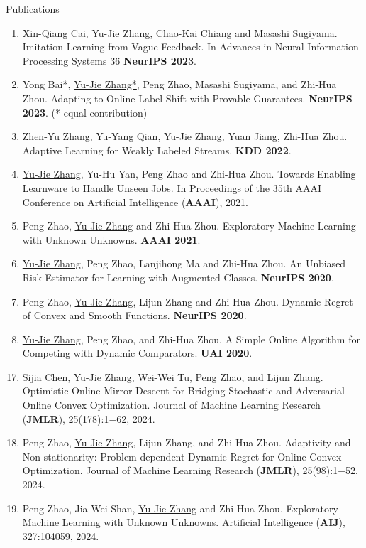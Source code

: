 \documentclass{resume} %
\begin{document}
\begin{rSection}{Publications}
\begin{enumerate}[leftmargin=0.2in]
	\item Xin-Qiang Cai, \underline{Yu-Jie Zhang}, Chao-Kai Chiang and Masashi Sugiyama. Imitation Learning from Vague Feedback. In {Advances in Neural Information Processing Systems 36} \textbf{NeurIPS 2023}.
	
	\item Yong Bai*, \underline{Yu-Jie Zhang*}, Peng Zhao, Masashi Sugiyama, and Zhi-Hua Zhou. Adapting to Online Label Shift with Provable Guarantees. \textbf{NeurIPS 2023}.  (* equal contribution)
	
	\item Zhen-Yu Zhang, Yu-Yang Qian, \underline{Yu-Jie Zhang}, Yuan Jiang, Zhi-Hua Zhou. Adaptive Learning for Weakly Labeled Streams. \textbf{KDD 2022}.
	
	\item \underline{Yu-Jie Zhang}, Yu-Hu Yan, Peng Zhao and Zhi-Hua Zhou. Towards Enabling Learnware to Handle Unseen Jobs. In {Proceedings of the 35th AAAI Conference on Artificial Intelligence} (\textbf{AAAI}), 2021.
	\item Peng Zhao, \underline{Yu-Jie Zhang} and Zhi-Hua Zhou. Exploratory Machine Learning with Unknown Unknowns. \textbf{AAAI 2021}.
	
	\item \underline{Yu-Jie Zhang}, Peng Zhao, Lanjihong Ma and Zhi-Hua Zhou. An Unbiased Risk Estimator for Learning with Augmented Classes. \textbf{NeurIPS 2020}.
	
	\item Peng Zhao, \underline{Yu-Jie Zhang}, Lijun Zhang and Zhi-Hua Zhou. Dynamic Regret of Convex and Smooth Functions. \textbf{NeurIPS 2020}.
	
	\item \underline{Yu-Jie Zhang}, Peng Zhao, and Zhi-Hua Zhou. A Simple Online Algorithm for Competing with Dynamic Comparators. \textbf{UAI 2020}.
\end{enumerate}
\vspace{2mm}
\begin{enumerate}[leftmargin=0.2in]
	\setcounter{enumi}{16}
	\item Sijia Chen, \underline{Yu-Jie Zhang}, Wei-Wei Tu, Peng Zhao, and Lijun Zhang. Optimistic Online Mirror Descent for Bridging Stochastic and Adversarial Online Convex Optimization. Journal of Machine Learning Research (\textbf{JMLR}), 25(178):1−62, 2024.
	\item Peng Zhao, \underline{Yu-Jie Zhang}, Lijun Zhang, and Zhi-Hua Zhou. Adaptivity and Non-stationarity: Problem-dependent Dynamic Regret for Online Convex Optimization. Journal of Machine Learning Research (\textbf{JMLR}), 25(98):1−52, 2024.
	\item Peng Zhao, Jia-Wei Shan, \underline{Yu-Jie Zhang} and Zhi-Hua Zhou. Exploratory Machine Learning with Unknown Unknowns. Artificial Intelligence (\textbf{AIJ}), 327:104059, 2024.
\end{enumerate}
\end{rSection}
\end{document}
